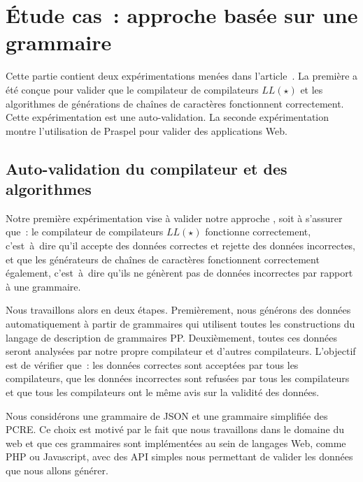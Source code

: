 \section{Étude cas~: approche basée sur une grammaire}
\label{section:experimentation:grammar}

Cette partie contient deux expérimentations menées dans
l'article~. La première a été conçue pour valider que le
compilateur de compilateurs $LL(\star)$ et les algorithmes de générations de
chaînes de caractères fonctionnent correctement. Cette expérimentation est une
auto-validation. La seconde expérimentation montre l'utilisation de Praspel pour
valider des applications Web.

\subsection{Auto-validation du compilateur et des algorithmes}

Notre première expérimentation vise à valider notre approche
, soit à s'assurer que~: le compilateur de
compilateurs $LL(\star)$ fonctionne correctement, c'est~à~dire qu'il accepte des
données correctes et rejette des données incorrectes, et que les générateurs de
chaînes de caractères fonctionnent correctement également, c'est~à~dire qu'ils
ne génèrent pas de données incorrectes par rapport à une grammaire.

Nous travaillons alors en deux étapes. Premièrement, nous générons des données
automatiquement à partir de grammaires qui utilisent toutes les constructions du
langage de description de grammaires PP. Deuxièmement, toutes ces données seront
analysées par notre propre compilateur et d'autres compilateurs. L'objectif est
de vérifier que~: les données correctes sont acceptées par tous les
compilateurs, que les données incorrectes sont refusées par tous les
compilateurs et que tous les compilateurs ont le même avis sur la validité des
données.

Nous considérons une grammaire de JSON et une grammaire simplifiée des PCRE. Ce
choix est motivé par le fait que nous travaillons dans le domaine du web et que
ces grammaires sont implémentées au sein de langages Web, comme PHP ou
Javascript, avec des API simples nous permettant de valider les données que nous
allons générer.

